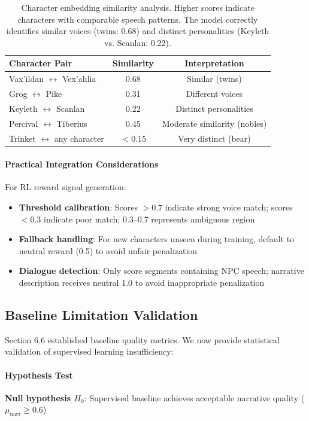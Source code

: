 \documentclass[11pt]{article}
\begin{document}
\begin{table}[h]
\centering
\small
\begin{tabular}{lcc}
\toprule
\textbf{Character Pair} & \textbf{Similarity} & \textbf{Interpretation} \\
\midrule
Vax'ildan $\leftrightarrow$ Vex'ahlia & 0.68 & Similar (twins) \\
Grog $\leftrightarrow$ Pike & 0.31 & Different voices \\
Keyleth $\leftrightarrow$ Scanlan & 0.22 & Distinct personalities \\
Percival $\leftrightarrow$ Tiberius & 0.45 & Moderate similarity (nobles) \\
Trinket $\leftrightarrow$ any character & $<0.15$ & Very distinct (bear) \\
\bottomrule
\end{tabular}
\caption{Character embedding similarity analysis. Higher scores indicate characters with comparable speech patterns. The model correctly identifies similar voices (twins: 0.68) and distinct personalities (Keyleth vs. Scanlan: 0.22).}
\end{table}

\paragraph{Practical Integration Considerations}
For RL reward signal generation:
\begin{itemize}
    \item \textbf{Threshold calibration}: Scores $>0.7$ indicate strong voice match; scores $<0.3$ indicate poor match; 0.3--0.7 represents ambiguous region
    \item \textbf{Fallback handling}: For new characters unseen during training, default to neutral reward (0.5) to avoid unfair penalization
    \item \textbf{Dialogue detection}: Only score segments containing NPC speech; narrative description receives neutral 1.0 to avoid inappropriate penalization
\end{itemize}


\subsection{Baseline Limitation Validation}

Section 6.6 established baseline quality metrics. We now provide statistical validation of supervised learning insufficiency:

\paragraph{Hypothesis Test}
\textbf{Null hypothesis $H_0$}: Supervised baseline achieves acceptable narrative quality ($\mu_{\text{narr}} \geq 0.6$)
\end{document}
